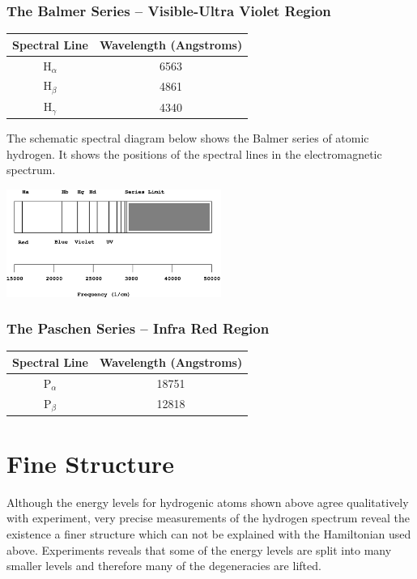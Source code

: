 \documentclass[a4paper]{serif}
\begin{document}
    \subsubsection{The Balmer Series -- Visible-Ultra Violet Region}
    \begin{center}
        \begin{tabular}{cc} \hline
        Spectral Line & Wavelength (Angstroms) \\ \hline \hline
        H$_{\alpha}$     &   6563    \\ 
        H$_{\beta}$      &   4861    \\ 
        H$_{\gamma}$     &   4340   \\ \hline
        \end{tabular}
    \end{center}
    The schematic spectral diagram below shows the Balmer series of atomic
    hydrogen. It shows the positions of the spectral lines in the electromagnetic
    spectrum.
    \begin{center}
        \includegraphics[width=7cm]{balmer.eps}
    \end{center}

    \subsubsection{The Paschen Series -- Infra Red Region}
     \begin{center}
        \begin{tabular}{cc} \hline
        Spectral Line & Wavelength (Angstroms) \\ \hline \hline
        P$_{\alpha}$     &   18751    \\ 
        P$_{\beta}$      &   12818    \\  \hline
        \end{tabular}
    \end{center}

\section{Fine Structure}
    Although the energy levels for hydrogenic atoms shown above agree qualitatively with
    experiment, very precise measurements of the hydrogen spectrum reveal the existence 
    a finer structure which can not be explained with the Hamiltonian used above.
    Experiments reveals that some of the energy levels are split into many smaller levels
    and therefore many of the degeneracies are lifted.
\end{document}
